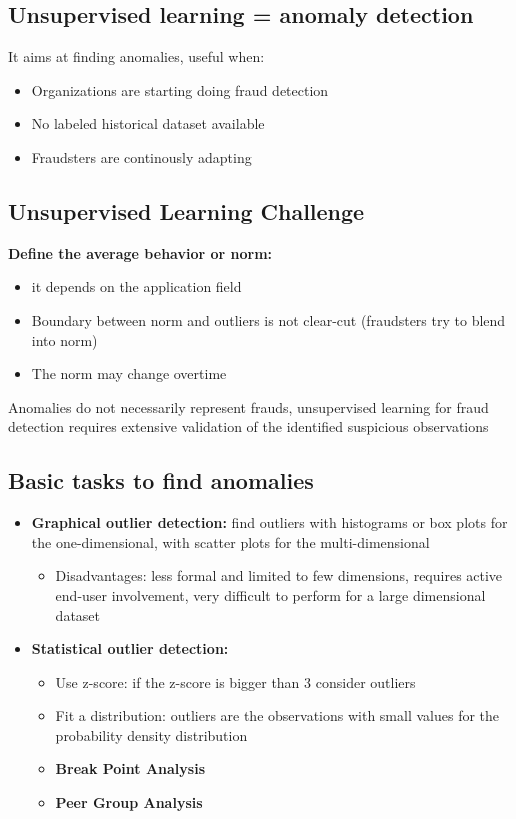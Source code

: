     \subsection{Unsupervised learning = anomaly detection}
        It aims at finding anomalies, useful when:
        \begin{itemize}
            \item Organizations are starting doing fraud detection 
            \item No labeled historical dataset available 
            \item Fraudsters are continously adapting
        \end{itemize}
    \subsection{Unsupervised Learning Challenge}
        \textbf{Define the average behavior or norm:} 
        \begin{itemize}
            \item it depends on the application field
            \item Boundary between norm and outliers is not clear-cut (fraudsters try to blend into norm)
            \item The norm may change overtime
        \end{itemize}
        Anomalies do not necessarily represent frauds, unsupervised learning for fraud detection requires extensive validation of the identified suspicious observations
    \subsection{Basic tasks to find anomalies}
        \begin{itemize}
            \item \textbf{Graphical outlier detection:} find outliers with histograms or box plots for the one-dimensional, with scatter plots for the multi-dimensional
            \begin{itemize}
                \item Disadvantages: less formal and limited to few dimensions, requires active end-user involvement, very difficult to perform for a large dimensional dataset
            \end{itemize}
            \item \textbf{Statistical outlier detection:}
            \begin{itemize}
                \item Use z-score: if the z-score is bigger than 3 consider outliers 
                \item Fit a distribution: outliers are the observations with small values for the probability density distribution 
                \item \textbf{Break Point Analysis}
                \item \textbf{Peer Group Analysis}
            \end{itemize}
        \end{itemize}
